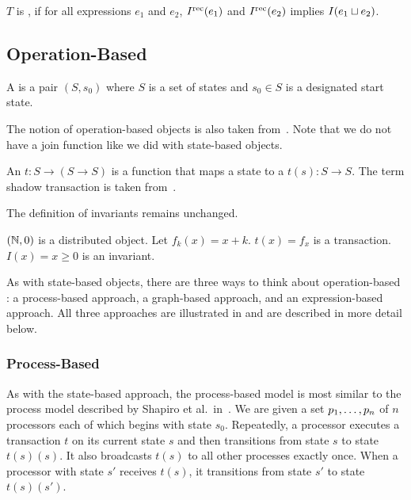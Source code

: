 \begin{definition}
  $T$ is , if for all expressions $e_1$ and $e_2$,
  $I^{\text{rec}}(e_1)$ and $I^{\text{rec}}(e_2)$ implies $I(e_1 \sqcup e_2)$.
\end{definition}

\subsection{Operation-Based}
\begin{definition}
  A  is a pair $(S, s_0)$
  where $S$ is a set of states and $s_0 \in S$ is a designated start state.
\end{definition}

The notion of operation-based objects is also taken
from~\cite{shapiro2011conflict}. Note that we do not have a join function like
we did with state-based objects.

\begin{definition}
  An  $t: S \to (S \to S)$ is a function
  that maps a state to a  $t(s): S \to S$. The term
  shadow transaction is taken from~\cite{li2014automating}.
\end{definition}

The definition of invariants remains unchanged.

\begin{example}
  $(\mathbb{N}, 0)$ is a distributed object. Let $f_k(x) = x + k$. $t(x) = f_x$ is a
  transaction. $I(x) = x \geq 0$ is an invariant.
\end{example}

As with state-based objects, there are three ways to think about
operation-based \Iconfluence{}: a process-based approach, a graph-based
approach, and an expression-based approach. All three approaches are
illustrated in  and are described in more detail below.



\subsubsection{Process-Based}
As with the state-based approach, the process-based model is most similar to
the process model described by Shapiro et al.\ in~\cite{shapiro2011conflict}.
We are given a set ${p}_{1}, \ldots, {p}_{n}$ of $n$ processors each of which begins with
state $s_0$. Repeatedly, a processor executes a transaction $t$ on its current
state $s$ and then transitions from state $s$ to state $t(s)(s)$. It also
broadcasts $t(s)$ to all other processes exactly once. When a processor with
state $s'$ receives $t(s)$, it transitions from state $s'$ to state $t(s)(s')$.

